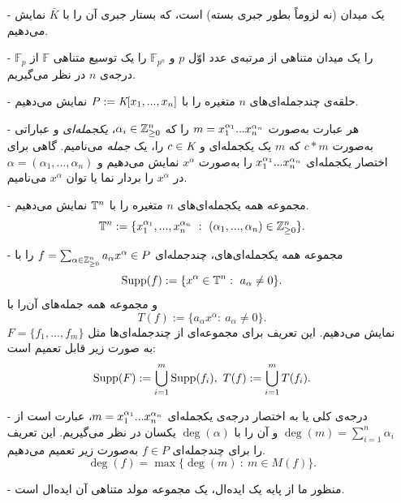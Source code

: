 \begin{itemize}
\item[-]
\fld
یک میدان (نه لزوماً بطور جبری بسته) است، که بستار جبری آن را با 
$\bar{K}$
نمایش می‌دهیم.
\item[-]
$\mathbb{F}_{p}$
را یک میدان متناهی از مرتبه‌ی عدد اوّل 
$p$
و 
$\mathbb{F}_{p^{n}}$
را یک توسیع متناهی
$\mathbb{F}$
 از درجه‌ی 
$n$
در نظر می‌گیریم. 
\item[-]
حلقه‌ی چندجمله‌ای‌های 
$n$
متغیره را با 
$P:=\textit{K}[x_{1},...,x_{n}]$
نمایش می‌دهیم.
\item[-]
هر عبارت به‌صورت 
$m = x_{1}^{\alpha_{1}}...x_{n}^{\alpha_{n}}$
را که 
$\alpha_{i}\in\mathbb{Z}_{\geq 0}^{n}$، 
\textit{یکجمله‌ای}
و عباراتی به‌صورت 
$c*m$
که 
$m$
یک یکجمله‌ای و 
$c\in\textit{K}$
 را،  یک 
\textit{جمله} 
می‌نامیم. گاهی برای اختصار  یکجمله‌ای 
$x_{1}^{\alpha_{1}}...x_{n}^{\alpha_{n}}$
را به‌صورت 
$x^{\alpha}$
نمایش می‌دهیم و 
$\alpha = (\alpha_{1},...,\alpha_{n})$
در 
$x^{\alpha}$
را بردار نما یا توان 
$x^{\alpha}$
می‌نامیم. 
\item[-]
مجموعه‌  همه‌  یکجمله‌ای‌های 
$n$
متغیره را با 
${\mathbb{T}}^{n} $
نمایش می‌دهیم.
$$\tn := \{x_{1}^{\alpha_{1}},...,x_{n}^{\alpha_{n}} \ : \ (\alpha_{1},...,\alpha_{n})\in \zedn\}.$$

\item[-]
مجموعه‌  همه‌  یکجمله‌ای‌های، چندجمله‌ای 
$f = \sum_{\alpha\in \mathbb{Z}_{\geq 0}^{n}}a_{\alpha}x^{\alpha}\in P$
را با 
$$\operatorname{\mathrm{Supp}}(f):=\{x^{\alpha}\in {\mathbb{T}}^{n}: \ a_{\alpha}\neq 0\}.$$
و مجموعه‌  همه‌  جمله‌‌‌ها‌ی آن‌را با 
$$T(f):=\{a_{\alpha}x^{\alpha}: \ a_{\alpha}\neq 0\}.$$
نمایش می‌دهیم. این تعریف  برای مجموعه‌ا‌ی از چندجمله‌ای‌ها مثل 
$F = \{f_{1},...,f_{m}\}$
 به صورت زیر قابل تعمیم است:
 $$\Supp(F):=\bigcup_{i = 1}^{m} \Supp(f_{i}), \ T(f):=\bigcup_{i = 1}^{m}T(f_{i}).$$
\item[-]
درجه‌ی کلی
یا به اختصار درجه‌ی یکجمله‌ای 
$m = x_{1}^{\alpha_{1}}...x_{n}^{\alpha_{n}}$، 
عبارت‌ است از 
$\deg(m) = \sum_{i = 1}^{n}\alpha_{i}$
و آن‌ را با 
$\deg(\alpha)$
یکسان در نظر می‌گیریم. این تعریف را برای چندجمله‌ای 
$f\in P$
به‌صورت زیر تعمیم می‌دهیم.
$$\deg(f) = \max\{\deg(m) \ : \ m\in M(f)\}.$$
\item[-]
منظور ما از پایه یک ایده‌ال، یک مجموعه‌  مولد متناهی آن ایده‌ال است. 
\end{itemize}


